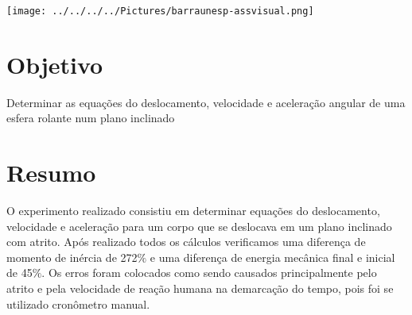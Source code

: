 \documentclass[
	12pt,				%
	oneside,			%
	a4paper,			%
	english,			%
	french,				%
	spanish,			%
	brazil,				%
	]{abntex2}
\begin{document}
\begin{minipage}[c][1.5cm][c]{3cm} %

\texttt{[image: ../../../../Pictures/barraunesp-assvisual.png]}

\end{minipage}


\frenchspacing 


\imprimircapa


\tableofcontents*
\newpage

\section[Objetivo]{Objetivo}
\pagestyle{fancy}
Determinar as equações do deslocamento, velocidade e aceleração angular de uma esfera rolante num plano inclinado 
\newpage
\section[Resumo]{Resumo}
\pagestyle{fancy}
O experimento realizado consistiu em determinar equações do deslocamento, velocidade e aceleração para um corpo que se deslocava em um plano inclinado com atrito. Após realizado todos os cálculos verificamos uma diferença de momento de inércia de 272$\%$ e uma diferença de energia mecânica final e inicial de 45$\%$. Os erros foram colocados como sendo causados principalmente pelo atrito e pela velocidade de reação humana na demarcação do tempo, pois foi se utilizado cronômetro manual.

\end{document}
